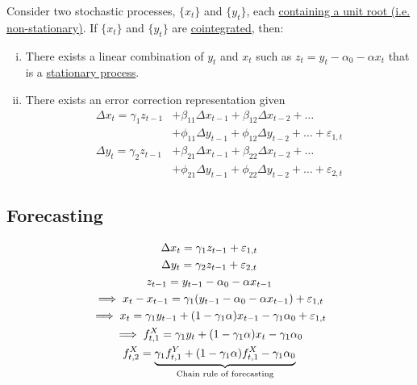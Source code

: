 \documentclass[11pt]{article}
\begin{document}
            \begin{theorem}
                Consider two stochastic processes, $\{x_t\}$ and $\{y_t\}$, each \ul{containing a unit root (i.e. non-stationary)}. If $\{x_t\}$ and $\{y_t\}$ are \ul{cointegrated}, then:
                \begin{enumerate}[(i)]
                    \item There exists a linear combination of $y_t$ and $x_t$ such as $z_t = y_t - \alpha_0 - \alpha x_t$ that is a \ul{stationary process}.
                    \item There exists an error correction representation given
                    \begin{align}
                        \Delta x_t = \gamma_1 z_{t-1} &+ \beta_{11} \Delta x_{t-1} + \beta_{12} \Delta x_{t-2} + \dots \\
                        &+ \phi_{11} \Delta y_{t-1} + \phi_{12} \Delta y_{t-2} + \dots + \varepsilon_{1, t} \\
                        \Delta y_t = \gamma_2 z_{t-1} &+ \beta_{21} \Delta x_{t-1} + \beta_{22} \Delta x_{t-2} + \dots \\
                        &+ \phi_{21} \Delta y_{t-1} + \phi_{22} \Delta y_{t-2} + \dots + \varepsilon_{2, t}
                    \end{align}
                \end{enumerate}
            \end{theorem}
            
        \subsection{Forecasting}
            \begin{example}
                \begin{gather}
                    \Delta x_t = \gamma_1 z_{t-1} + \varepsilon_{1,t} \\
                    \Delta y_t = \gamma_2 z_{t-1} + \varepsilon_{2,t} \\
                    z_{t-1} = y_{t-1} - \alpha_0 - \alpha x_{t-1} \\
                    \implies x_t - x_{t-1} = \gamma_1(y_{t-1} - \alpha_0 - \alpha x_{t-1}) + \varepsilon_{1,t} \\
                    \implies x_t = \gamma_1 y_{t-1} + (1 - \gamma_1 \alpha) x_{t-1} - \gamma_1 \alpha_0 + \varepsilon_{1,t} \\
                    \implies f^X_{t,1} = \gamma_1 y_t + (1 - \gamma_1 \alpha) x_t - \gamma_1 \alpha_0 \\
                    f^X_{t,2} = \underbrace{\gamma_1 f^Y_{t,1} + (1 - \gamma_1 \alpha) f^X_{t,1} - \gamma_1 \alpha_0}_{\text{{Chain rule of forecasting}}}
                \end{gather}
            \end{example}
            
\end{document}
